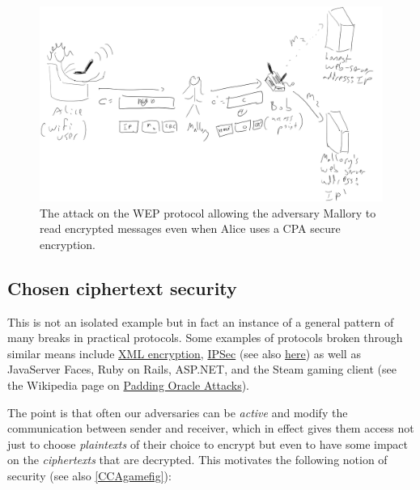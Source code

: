 \begin{figure}
\centering
\includegraphics[width=\textwidth, height=0.25\paperheight, keepaspectratio]{../figure/wep-attack.jpg}
\caption{The attack on the WEP protocol allowing the adversary Mallory
to read encrypted messages even when Alice uses a CPA secure
encryption.}
\label{WEPattackfig}
\end{figure}

\subsection{Chosen ciphertext security}\label{6-Chosen-ciphertext-secu}

This is not an isolated example but in fact an instance of a general
pattern of many breaks in practical protocols. Some examples of
protocols broken through similar means include
\href{http://www.nds.rub.de/media/nds/veroeffentlichungen/2011/10/22/HowToBreakXMLenc.pdf}{XML
encryption},
\href{https://www.cs.columbia.edu/~smb/papers/badesp.pdf}{IPSec} (see
also \href{https://eprint.iacr.org/2005/416}{here}) as well as
JavaServer Faces, Ruby on Rails, ASP.NET, and the Steam gaming client
(see the Wikipedia page on \href{https://goo.gl/b5aKYg}{Padding Oracle
Attacks}).

The point is that often our adversaries can be \emph{active} and modify
the communication between sender and receiver, which in effect gives
them access not just to choose \emph{plaintexts} of their choice to
encrypt but even to have some impact on the \emph{ciphertexts} that are
decrypted. This motivates the following notion of security (see also
\cref{CCAgamefig}):

